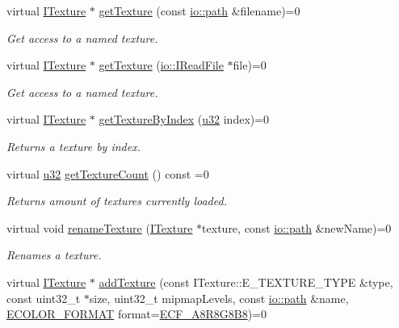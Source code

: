 \begin{DoxyCompactItemize}
virtual \hyperlink{classirr_1_1video_1_1ITexture}{I\+Texture} $\ast$ \hyperlink{classirr_1_1video_1_1IVideoDriver_af4055165190e4adf221c6dc6f2434ea0}{get\+Texture} (const \hyperlink{namespaceirr_1_1io_ab1bdc45edb3f94d8319c02bc0f840ee1}{io\+::path} \&filename)=0
\begin{DoxyCompactList}\small\item\em Get access to a named texture. \end{DoxyCompactList}\item 
virtual \hyperlink{classirr_1_1video_1_1ITexture}{I\+Texture} $\ast$ \hyperlink{classirr_1_1video_1_1IVideoDriver_aaf989c8688ffe2a28a4b8e7b6ec2bce7}{get\+Texture} (\hyperlink{classirr_1_1io_1_1IReadFile}{io\+::\+I\+Read\+File} $\ast$file)=0
\begin{DoxyCompactList}\small\item\em Get access to a named texture. \end{DoxyCompactList}\item 
virtual \hyperlink{classirr_1_1video_1_1ITexture}{I\+Texture} $\ast$ \hyperlink{classirr_1_1video_1_1IVideoDriver_abfe395b1320ac52cea6be0e912135351}{get\+Texture\+By\+Index} (\hyperlink{namespaceirr_a0416a53257075833e7002efd0a18e804}{u32} index)=0
\begin{DoxyCompactList}\small\item\em Returns a texture by index. \end{DoxyCompactList}\item 
virtual \hyperlink{namespaceirr_a0416a53257075833e7002efd0a18e804}{u32} \hyperlink{classirr_1_1video_1_1IVideoDriver_acdfe6845b292baeff2fa160890c6d193}{get\+Texture\+Count} () const  =0
\begin{DoxyCompactList}\small\item\em Returns amount of textures currently loaded. \end{DoxyCompactList}\item 
virtual void \hyperlink{classirr_1_1video_1_1IVideoDriver_a2cefddb9ebd7f46ee946c04b301a5c5b}{rename\+Texture} (\hyperlink{classirr_1_1video_1_1ITexture}{I\+Texture} $\ast$texture, const \hyperlink{namespaceirr_1_1io_ab1bdc45edb3f94d8319c02bc0f840ee1}{io\+::path} \&new\+Name)=0
\begin{DoxyCompactList}\small\item\em Renames a texture. \end{DoxyCompactList}\item 
virtual \hyperlink{classirr_1_1video_1_1ITexture}{I\+Texture} $\ast$ \hyperlink{classirr_1_1video_1_1IVideoDriver_a10d535f75351c4c65ac29a30407db530}{add\+Texture} (const I\+Texture\+::\+E\+\_\+\+T\+E\+X\+T\+U\+R\+E\+\_\+\+T\+Y\+PE \&type, const uint32\+\_\+t $\ast$size, uint32\+\_\+t mipmap\+Levels, const \hyperlink{namespaceirr_1_1io_ab1bdc45edb3f94d8319c02bc0f840ee1}{io\+::path} \&name, \hyperlink{namespaceirr_1_1video_a1d5e487888c32b1674a8f75116d829ed}{E\+C\+O\+L\+O\+R\+\_\+\+F\+O\+R\+M\+AT} format=\hyperlink{namespaceirr_1_1video_a1d5e487888c32b1674a8f75116d829eda55c57d63efff39efe33ee733fe962df0}{E\+C\+F\+\_\+\+A8\+R8\+G8\+B8})=0

\end{DoxyCompactItemize}
